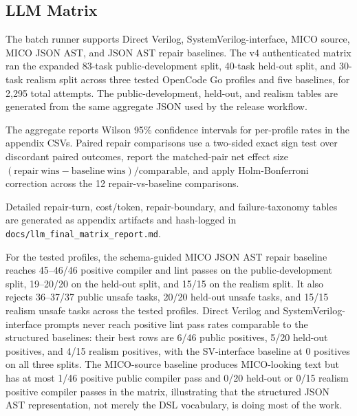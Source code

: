 \begin{table}[t]
  \centering
  \caption{Vivado out-of-context QoR threshold summary}
  \label{tab:vivado-qor-thresholds}
  \resizebox{\columnwidth}{!}{}
\end{table}

\subsection{LLM Matrix}

The batch runner supports Direct Verilog, SystemVerilog-interface, MICO source,
MICO JSON AST, and JSON AST repair baselines. The v4 authenticated matrix ran
the expanded 83-task public-development split, 40-task held-out split, and
30-task realism split across three tested OpenCode Go profiles and five
baselines, for 2,295 total attempts. The public-development, held-out, and
realism tables are generated from the same aggregate JSON used by the release
workflow.

The aggregate reports Wilson 95\% confidence intervals for per-profile rates
in the appendix CSVs. Paired repair comparisons use a two-sided exact sign test
over discordant paired outcomes, report the matched-pair net effect size
$(\mathrm{repair\ wins}-\mathrm{baseline\ wins})/\mathrm{comparable}$, and apply
Holm-Bonferroni correction across the 12 repair-vs-baseline comparisons.

\begin{table}[t]
  \centering
  \caption{Authenticated LLM matrix compact summary generated from aggregate JSON}
  
\end{table}

\begin{table}[t]
  \centering
  \caption{JSON AST repair paired comparisons with exact and Holm-adjusted paired tests generated from aggregate JSON}
  \label{tab:llm-paired-comparisons}
  \resizebox{\textwidth}{!}{}
\end{table}

Detailed repair-turn, cost/token, repair-boundary, and failure-taxonomy tables
are generated as appendix artifacts and hash-logged in
\texttt{docs/llm\_final\_matrix\_report.md}.

For the tested profiles, the schema-guided MICO JSON AST repair baseline reaches
45--46/46 positive compiler and lint passes on the public-development split,
19--20/20 on the held-out split, and 15/15 on the realism split. It also rejects
36--37/37 public unsafe tasks, 20/20 held-out unsafe tasks, and 15/15 realism
unsafe tasks across the tested profiles. Direct Verilog and
SystemVerilog-interface prompts never reach positive lint pass rates comparable
to the structured baselines: their best rows are 6/46 public positives, 5/20
held-out positives, and 4/15 realism positives, with the SV-interface baseline
at 0 positives on all three splits. The MICO-source baseline produces
MICO-looking text but has at most 1/46 positive public compiler pass and 0/20
held-out or 0/15 realism positive compiler passes in the matrix, illustrating
that the structured JSON AST representation, not merely the DSL vocabulary, is
doing most of the work.

